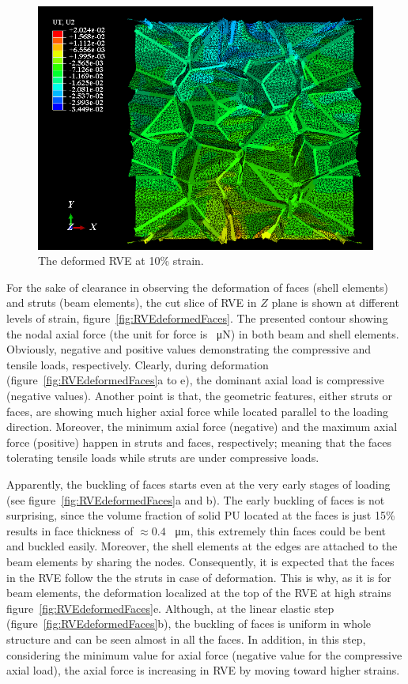 \documentclass[review]{elsarticle}
\begin{document}
\begin{figure}[hb]
  \centering
  \includegraphics[scale=0.6]{StrainLocalization}
  \captionsetup{justification=centering}
  \caption[Close up of \textit{Hemidactylus} sp. ]
   {The deformed RVE at 10\% strain.}
  \label{fig:RVEdeformed}
\end{figure} 

For the sake of clearance in observing the deformation of faces (shell elements) and struts (beam elements), the cut slice of RVE in $Z$ plane is shown at different levels of strain, figure~\ref{fig:RVEdeformedFaces}. The presented contour showing the nodal axial force (the unit for force is \SI{}{\micro\N}) in both beam and shell elements. Obviously, negative and positive values demonstrating the compressive and tensile loads, respectively. Clearly, during deformation (figure~\ref{fig:RVEdeformedFaces}a to e), the dominant axial load is compressive (negative values). Another point is that, the geometric features, either struts or faces, are showing much higher axial force while located parallel to the loading direction. Moreover, the minimum axial force (negative) and the maximum axial force (positive) happen in struts and faces, respectively; meaning that the faces tolerating tensile loads while struts are under compressive loads.

Apparently, the buckling of faces starts even at the very early stages of loading (see figure~\ref{fig:RVEdeformedFaces}a and b). The early buckling of faces is not surprising, since the volume fraction of solid PU located at the faces is just 15\% results in face thickness of $\approx 0.4$      \SI{}{\micro\metre}, this extremely thin faces could be bent and buckled easily. Moreover, the shell elements at the edges are attached to the beam elements by sharing the nodes. Consequently, it is expected that the faces in the RVE follow the the struts in case of deformation. This is why, as it is for beam elements, the deformation localized at the top of the RVE at high strains figure~\ref{fig:RVEdeformedFaces}e. Although, at the linear elastic step (figure~\ref{fig:RVEdeformedFaces}b), the buckling of faces is uniform in whole structure and can be seen almost in all the faces. In addition, in this step, considering the minimum value for axial force (negative value for the compressive axial load),  the axial force is increasing in RVE by moving toward higher strains. 
\end{document}
